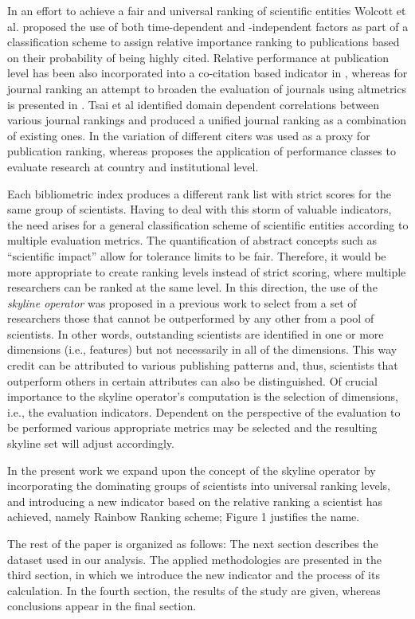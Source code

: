 In an effort to achieve a fair and universal ranking of scientific
entities Wolcott et al. proposed the use of both time-dependent and
-independent factors as part of a classification scheme to assign
relative importance ranking to publications based on their probability
of being highly cited. Relative performance at publication level has
been also incorporated into a co-citation based indicator in , whereas
for journal ranking an attempt to broaden the evaluation of journals
using altmetrics is presented in . Tsai et al identified domain
dependent correlations between various journal rankings and produced a
unified journal ranking as a combination of existing ones. In the
variation of different citers was used as a proxy for publication
ranking, whereas proposes the application of performance classes to
evaluate research at country and institutional level.

Each bibliometric index produces a different rank list with strict
scores for the same group of scientists. Having to deal with this storm
of valuable indicators, the need arises for a general classification
scheme of scientific entities according to multiple evaluation metrics.
The quantification of abstract concepts such as ``scientific impact''
allow for tolerance limits to be fair. Therefore, it would be more
appropriate to create ranking levels instead of strict scoring, where
multiple researchers can be ranked at the same level. In this direction,
the use of the \emph{skyline operator} was proposed in a previous work
to select from a set of researchers those that cannot be outperformed by
any other from a pool of scientists. In other words, outstanding
scientists are identified in one or more dimensions (i.e., features) but
not necessarily in all of the dimensions. This way credit can be
attributed to various publishing patterns and, thus, scientists that
outperform others in certain attributes can also be distinguished. Of
crucial importance to the skyline operator's computation is the
selection of dimensions, i.e., the evaluation indicators. Dependent on
the perspective of the evaluation to be performed various appropriate
metrics may be selected and the resulting skyline set will adjust
accordingly.

In the present work we expand upon the concept of the skyline operator
by incorporating the dominating groups of scientists into universal
ranking levels, and introducing a new indicator based on the relative
ranking a scientist has achieved, namely Rainbow Ranking scheme; Figure
1 justifies the name.

The rest of the paper is organized as follows: The next section
describes the dataset used in our analysis. The applied methodologies
are presented in the third section, in which we introduce the new
indicator and the process of its calculation. In the fourth section, the
results of the study are given, whereas conclusions appear in the final
section.